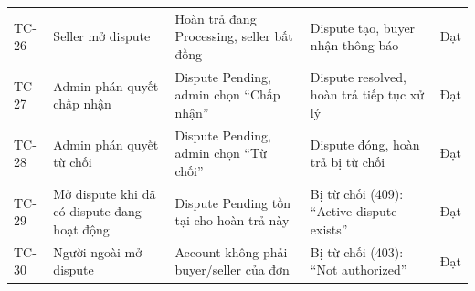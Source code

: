 \begin{longtable}{@{}L{1.2cm}L{3cm}L{4cm}L{4.5cm}L{0.8cm}@{}}
TC-26 & Seller mở dispute & Hoàn trả đang Processing, seller bất đồng & Dispute tạo, buyer nhận thông báo & Đạt \\
TC-27 & Admin phán quyết chấp nhận & Dispute Pending, admin chọn ``Chấp nhận'' & Dispute resolved, hoàn trả tiếp tục xử lý & Đạt \\
TC-28 & Admin phán quyết từ chối & Dispute Pending, admin chọn ``Từ chối'' & Dispute đóng, hoàn trả bị từ chối & Đạt \\
TC-29 & Mở dispute khi đã có dispute đang hoạt động & Dispute Pending tồn tại cho hoàn trả này & Bị từ chối (409): ``Active dispute exists'' & Đạt \\
TC-30 & Người ngoài mở dispute & Account không phải buyer/seller của đơn & Bị từ chối (403): ``Not authorized'' & Đạt \\
\end{longtable}
\normalsize
